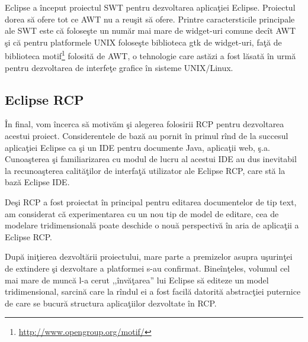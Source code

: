 Eclipse a început proiectul SWT pentru dezvoltarea aplicaţiei Eclipse. 
Proiectul dorea să ofere tot ce AWT nu a reuşit să ofere. Printre 
caractersticile principale ale SWT este că foloseşte un număr mai mare de 
widget-uri comune decît AWT şi că pentru platformele UNIX foloseşte biblioteca 
gtk de widget-uri, faţă de biblioteca 
motif\footnote{\url{http://www.opengroup.org/motif/}} folosită de AWT, o 
tehnologie care astăzi a fost lăsată în urmă pentru dezvoltarea de interfeţe 
grafice în sisteme UNIX/Linux.
\subsection{Eclipse RCP}

În final, vom încerca să motivăm şi alegerea folosirii RCP pentru dezvoltarea 
acestui proiect. Considerentele de bază au pornit în primul rînd de la succesul 
aplicaţiei Eclipse ca şi un IDE pentru documente Java, aplicaţii web, ş.a. 
Cunoaşterea şi familiarizarea cu modul de lucru al acestui IDE au dus 
inevitabil la recunoaşterea calităţilor de interfaţă utilizator ale Eclipse 
RCP, care stă la bază Eclipse IDE.

Deşi RCP a fost proiectat în principal pentru editarea documentelor de tip 
text, am considerat că experimentarea cu un nou tip de model de editare, cea de 
modelare tridimensională poate deschide o nouă perspectivă în aria de aplicaţii 
a Eclipse RCP.

După iniţierea dezvoltării proiectului, mare parte a premizelor asupra 
uşurinţei de extindere şi dezvoltare a platformei s-au confirmat. Bineînţeles, 
volumul cel mai mare de muncă l-a cerut ,,învăţarea'' lui Eclipse să editeze un 
model tridimensional, sarcină care la rîndul ei a fost facilă datorită 
abstracţiei puternice de care se bucură structura aplicaţiilor dezvoltate în 
RCP.
